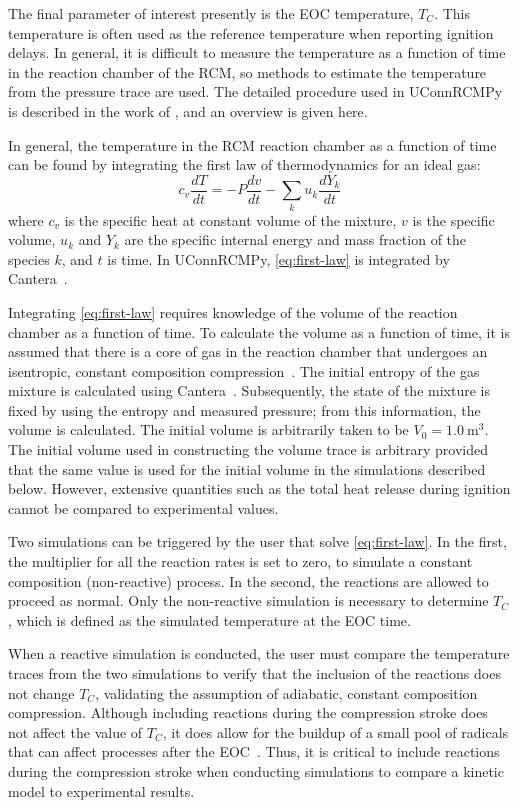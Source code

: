 \documentclass[12pt]{ussci}
\begin{document}
The final parameter of interest presently is the EOC temperature, \(T_C\). This
temperature is often used as the reference temperature when reporting ignition
delays. In general, it is difficult to measure the temperature as a function of
time in the reaction chamber of the RCM, so methods to estimate the temperature
from the pressure trace are used. The detailed procedure used in UConnRCMPy is
described in the work of \textcite{Dames2016}, and an overview is given here.

In general, the temperature in the RCM reaction chamber as a function of time
can be found by integrating the first law of thermodynamics for an ideal gas:
%
\begin{equation} \label{eq:first-law}
    c_v \frac{dT}{dt} = -P \frac{dv}{dt} - \sum_k u_k \frac{d Y_k}{dt}
\end{equation}
%
where \(c_v\) is the specific heat at constant volume of the mixture, \(v\) is
the specific volume, \(u_k\) and \(Y_k\) are the specific internal energy and
mass fraction of the species \(k\), and \(t\) is time. In UConnRCMPy,
\cref{eq:first-law} is integrated by Cantera~\autocite{cantera}.

Integrating \cref{eq:first-law} requires knowledge of the volume of the reaction
chamber as a function of time. To calculate the volume as a function of time, it
is assumed that there is a core of gas in the reaction chamber that undergoes an
isentropic, constant composition compression~\autocite{Lee1998}. The initial
entropy of the gas mixture is calculated using Cantera~\autocite{cantera}.
Subsequently, the state of the mixture is fixed by using the entropy and
measured pressure; from this information, the volume is calculated. The initial
volume is arbitrarily taken to be \(V_0=\SI{1.0}{\m\cubed}\). The initial volume
used in constructing the volume trace is arbitrary provided that the same value
is used for the initial volume in the simulations described below. However,
extensive quantities such as the total heat release during ignition cannot be
compared to experimental values.

Two simulations can be triggered by the user that solve \cref{eq:first-law}. In
the first, the multiplier for all the reaction rates is set to zero, to simulate
a constant composition (non-reactive) process. In the second, the reactions are
allowed to proceed as normal. Only the non-reactive simulation is necessary to
determine \(T_C\), which is defined as the simulated temperature at the EOC
time.

When a reactive simulation is conducted, the user must compare the
temperature traces from the two simulations to verify that the inclusion
of the reactions does not change \(T_C\), validating the assumption of
adiabatic, constant composition compression. Although including
reactions during the compression stroke does not affect the value of
\(T_C\), it does allow for the buildup of a small pool of radicals that
can affect processes after the EOC~\autocite{Mittal2008}. Thus, it is
critical to include reactions during the compression stroke when
conducting simulations to compare a kinetic model to experimental
results.
\end{document}
